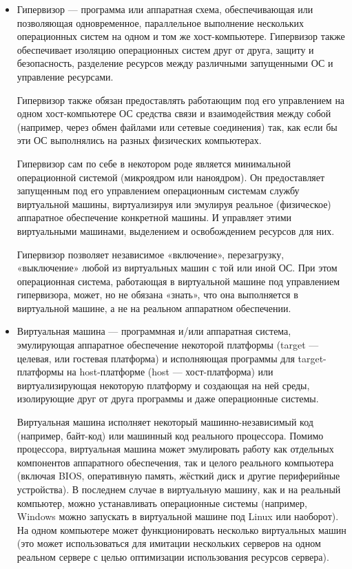 \documentclass[a4paper, 14pt]{article}
\begin{document}
\begin{itemize}
    \item 
    \par Гипервизор — программа или аппаратная схема, обеспечивающая или позволяющая одновременное, параллельное выполнение нескольких операционных систем на одном и том же хост-компьютере. Гипервизор также обеспечивает изоляцию операционных систем друг от друга, защиту и безопасность, разделение ресурсов между различными запущенными ОС и управление ресурсами.
    \par Гипервизор также обязан предоставлять работающим под его управлением на одном хост-компьютере ОС средства связи и взаимодействия между собой (например, через обмен файлами или сетевые соединения) так, как если бы эти ОС выполнялись на разных физических компьютерах.
    \par Гипервизор сам по себе в некотором роде является минимальной операционной системой (микроядром или наноядром). Он предоставляет запущенным под его управлением операционным системам службу виртуальной машины, виртуализируя или эмулируя реальное (физическое) аппаратное обеспечение конкретной машины. И управляет этими виртуальными машинами, выделением и освобождением ресурсов для них.
    \par Гипервизор позволяет независимое «включение», перезагрузку, «выключение» любой из виртуальных машин с той или иной ОС. При этом операционная система, работающая в виртуальной машине под управлением гипервизора, может, но не обязана «знать», что она выполняется в виртуальной машине, а не на реальном аппаратном обеспечении.
    
    \item 
    \par Виртуальная машина — программная и/или аппаратная система, эмулирующая аппаратное обеспечение некоторой платформы (target — целевая, или гостевая платформа) и исполняющая программы для target-платформы на host-платформе (host — хост-платформа) или виртуализирующая некоторую платформу и создающая на ней среды, изолирующие друг от друга программы и даже операционные системы.
    \par Виртуальная машина исполняет некоторый машинно-независимый код (например, байт-код) или машинный код реального процессора. Помимо процессора, виртуальная машина может эмулировать работу как отдельных компонентов аппаратного обеспечения, так и целого реального компьютера (включая BIOS, оперативную память, жёсткий диск и другие периферийные устройства). В последнем случае в виртуальную машину, как и на реальный компьютер, можно устанавливать операционные системы (например, Windows можно запускать в виртуальной машине под Linux или наоборот). На одном компьютере может функционировать несколько виртуальных машин (это может использоваться для имитации нескольких серверов на одном реальном сервере с целью оптимизации использования ресурсов сервера).
\end{itemize}
\end{document}
